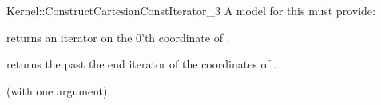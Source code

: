 \begin{ccRefFunctionObjectConcept}{Kernel::ConstructCartesianConstIterator_3}
A model for this must provide:



 {returns an iterator on the 0'th  coordinate of .}

 {returns the past the end iterator of the  coordinates of .}




\ccRefines
{} (with one argument)


\ccSeeAlso
{} \\


\end{ccRefFunctionObjectConcept}
